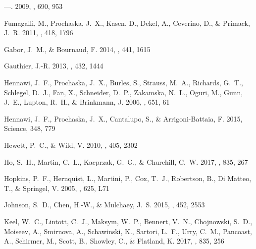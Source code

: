 \documentclass[iop]{emulateapj}
\begin{document}
\begin{thebibliography}{54}
---. 2009, \apj, 690, 953

{Fumagalli}, M., {Prochaska}, J.~X., {Kasen}, D., {Dekel}, A., {Ceverino}, D.,
  \& {Primack}, J.~R. 2011, \mnras, 418, 1796

{Gabor}, J.~M., \& {Bournaud}, F. 2014, \mnras, 441, 1615

{Gauthier}, J.-R. 2013, \mnras, 432, 1444

{Hennawi}, J.~F., {Prochaska}, J.~X., {Burles}, S., {Strauss}, M.~A.,
  {Richards}, G.~T., {Schlegel}, D.~J., {Fan}, X., {Schneider}, D.~P.,
  {Zakamska}, N.~L., {Oguri}, M., {Gunn}, J.~E., {Lupton}, R.~H., \&
  {Brinkmann}, J. 2006, \apj, 651, 61

{Hennawi}, J.~F., {Prochaska}, J.~X., {Cantalupo}, S., \& {Arrigoni-Battaia},
  F. 2015, Science, 348, 779

{Hewett}, P.~C., \& {Wild}, V. 2010, \mnras, 405, 2302

{Ho}, S.~H., {Martin}, C.~L., {Kacprzak}, G.~G., \& {Churchill}, C.~W. 2017,
  \apj, 835, 267

{Hopkins}, P.~F., {Hernquist}, L., {Martini}, P., {Cox}, T.~J., {Robertson},
  B., {Di Matteo}, T., \& {Springel}, V. 2005, \apjl, 625, L71

{Johnson}, S.~D., {Chen}, H.-W., \& {Mulchaey}, J.~S. 2015, \mnras, 452, 2553

{Keel}, W.~C., {Lintott}, C.~J., {Maksym}, W.~P., {Bennert}, V.~N.,
  {Chojnowski}, S.~D., {Moiseev}, A., {Smirnova}, A., {Schawinski}, K.,
  {Sartori}, L.~F., {Urry}, C.~M., {Pancoast}, A., {Schirmer}, M., {Scott}, B.,
  {Showley}, C., \& {Flatland}, K. 2017, \apj, 835, 256


\end{thebibliography}
\end{document}
